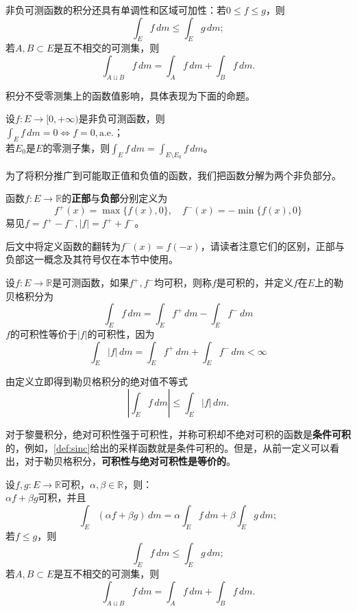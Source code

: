 非负可测函数的积分还具有单调性和区域可加性：若$0\leq f\leq g$，则
\[\int_E f\,dm\leq\int_E g\,dm;\]
若$A,B\subset E$是互不相交的可测集，则
\[\int_{A\sqcup B}f\,dm=\int_A f\,dm+\int_B f\,dm.\]

积分不受零测集上的函数值影响，具体表现为下面的命题。

\begin{proposition}
    设$f:E\to[0,+\infty)$是非负可测函数，则\\
    $\int_{E}f\,dm=0\iff f=0,\mathrm{a.e.}$；\\
    若$E_0$是$E$的零测子集，则$\int_{E}f\,dm=\int_{E\setminus E_0}f\,dm$。
\end{proposition}

为了将积分推广到可能取正值和负值的函数，我们把函数分解为两个非负部分。

\begin{definition}[函数的正部与负部]
    函数$f:E\to\mathbb{R}$的\textbf{正部}与\textbf{负部}分别定义为$$f^+(x)=\max\{f(x),0\},\quad f^-(x)=-\min\{f(x),0\}$$
    易见$f=f^+-f^-,|f|=f^++f^-$。
\end{definition}
后文中将定义函数的翻转为$f^-(x)=f(-x)$，请读者注意它们的区别，正部与负部这一概念及其符号仅在本节中使用。

\begin{definition}[可测函数的勒贝格积分]
    设$f:E\to\mathbb{R}$是可测函数，如果$f^+,f^-$均可积，则称$f$是可积的，并定义$f$在$E$上的勒贝格积分为
    \[\int_{E}f\,dm=\int_{E}f^+\,dm-\int_{E}f^-\,dm\]
    $f$的可积性等价于$|f|$的可积性，因为
    \[\int_{E}|f|\,dm=\int_{E}f^+\,dm+\int_{E}f^-\,dm<\infty\]
\end{definition}

由定义立即得到勒贝格积分的绝对值不等式
\[\left|\int_{E}f\,dm\right|\leq \int_{E}|f|\,dm.\]

对于黎曼积分，绝对可积性强于可积性，并称可积却不绝对可积的函数是\textbf{条件可积}的，例如，\cref{def:sinc}给出的采样函数就是条件可积的。但是，从前一定义可以看出，对于勒贝格积分，\textbf{可积性与绝对可积性是等价的}。

\begin{proposition}[勒贝格积分的基本性质]
    设$f,g:E\to\mathbb{R}$可积，$\alpha,\beta\in\mathbb{R}$，则：\\
    $\alpha f+\beta g$可积，并且
    \[\int_E(\alpha f+\beta g)\,dm=\alpha\int_E f\,dm+\beta\int_E g\,dm;\]
    若$f\leq g$，则
    \[\int_E f\,dm\leq\int_E g\,dm;\]
    若$A,B\subset E$是互不相交的可测集，则
    \[\int_{A\sqcup B}f\,dm=\int_A f\,dm+\int_B f\,dm.\]
\end{proposition}

